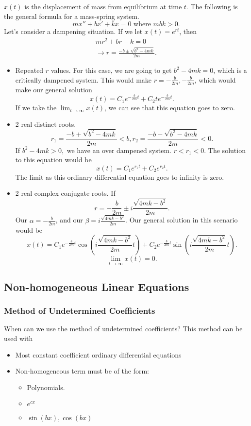   $x(t)$ is the displacement of mass from equilibrium at time $t$. The following is the general formula for a mass-spring system.
  \[
    mx''+bx'+kx=0 \text{ where $mbk>0$}
  .\] 
  Let's consider a dampening situation. If we let $x(t)=e^{rt}$, then 
  \begin{align*}
  mr^2+br+k=0\\
  \to r=\frac{-b\pm\sqrt{b^2-4mk} }{2m}
  .\end{align*}
  \begin{itemize}
    \item Repeated $r$ values.
      For this case, we are going to get $b^2-4mk=0$, which is a critically dampened system. This would make $r=-\frac{b}{2m},-\frac{b}{2m}$, which would make our general solution 
      \[
        x(t)=C_1e^{-\frac{b}{2m}t}+C_2te^{-\frac{b}{2m}t}
      .\] 
      If we take the $\lim_{t \to \infty} x(t) $, we can see that this equation goes to zero.
    \item 2 real distinct roots.
      \[
        r_1=\frac{-b+\sqrt{b^2-4mk} }{2m}<b, r_2=\frac{-b-\sqrt{b^2-4mk} }{2m} <0 
      .\] 
      If $b^2-4mk > 0,$ we have an over dampened system. $r<r_1<0$. The solution to this equation would be 
      \[
        x(t)=C_1e^{r_1t}+C_2e^{r_2t}
      .\] 
      The limit as this ordinary differential equation goes to infinity is zero.
    \item 2 real complex conjugate roots. If 
      \[
      r=-\frac{b}{2m}\pm i \frac{\sqrt{4mk-b^2} }{2m}
      .\] 
      Our $\alpha = -\frac{b}{2m}$, and our $\beta=i \frac{\sqrt{4mk-b^2} }{2m}$. Our general solution in this scenario would be 
      \[
        x(t)=C_1e^{-\frac{b}{2m}t}\cos\left( i \frac{\sqrt{4mk-b^2} }{2m}t \right) +C_2e^{-\frac{b}{2m}t}\sin\left( i \frac{\sqrt{4mk-b^2} }{2m}t \right) 
      .\] 
      \[
        \lim_{t \to \infty} x(t)=0
      .\] 
  \end{itemize}
\subsection{Non-homogeneous Linear Equations}

\subsubsection{Method of Undetermined Coefficients}

When can we use the method of undetermined coefficients? This method can be used with
\begin{itemize}
  \item Most constant coefficient ordinary differential equations
  \item Non-homogeneous term must be of the form:
    \begin{itemize}
      \item Polynomials.
      \item $e^{cx}$
      \item $\sin(bx),\cos(bx)$
    \end{itemize}
\end{itemize}

